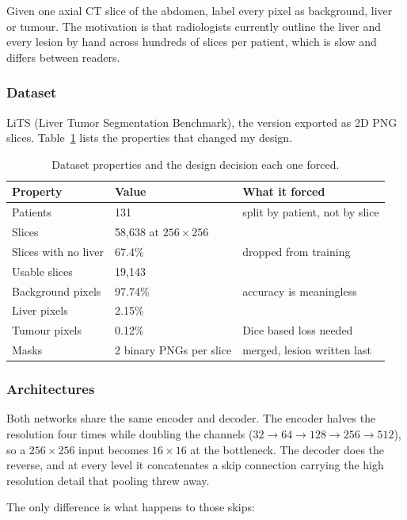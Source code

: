 \documentclass[11pt,a4paper]{article}
\begin{document}
Given one axial CT slice of the abdomen, label every pixel as background, liver
or tumour. The motivation is that radiologists currently outline the liver and
every lesion by hand across hundreds of slices per patient, which is slow and
differs between readers.

\subsubsection*{Dataset}

LiTS (Liver Tumor Segmentation Benchmark), the version exported as 2D PNG slices.
Table~\ref{tab:data} lists the properties that changed my design.

\begin{table}[H]
\centering
\small
\begin{tabular}{lll}
\toprule
\textbf{Property} & \textbf{Value} & \textbf{What it forced} \\
\midrule
Patients & 131 & split by patient, not by slice \\
Slices & 58{,}638 at $256\times256$ & \\
Slices with no liver & 67.4\% & dropped from training \\
Usable slices & 19{,}143 & \\
Background pixels & 97.74\% & accuracy is meaningless \\
Liver pixels & 2.15\% & \\
Tumour pixels & 0.12\% & Dice based loss needed \\
Masks & 2 binary PNGs per slice & merged, lesion written last \\
\bottomrule
\end{tabular}
\caption{Dataset properties and the design decision each one forced.}
\label{tab:data}
\end{table}

\subsubsection*{Architectures}

Both networks share the same encoder and decoder. The encoder halves the
resolution four times while doubling the channels
($32 \rightarrow 64 \rightarrow 128 \rightarrow 256 \rightarrow 512$), so a
$256\times256$ input becomes $16\times16$ at the bottleneck. The decoder does the
reverse, and at every level it concatenates a skip connection carrying the
high resolution detail that pooling threw away.

The only difference is what happens to those skips:
\end{document}
